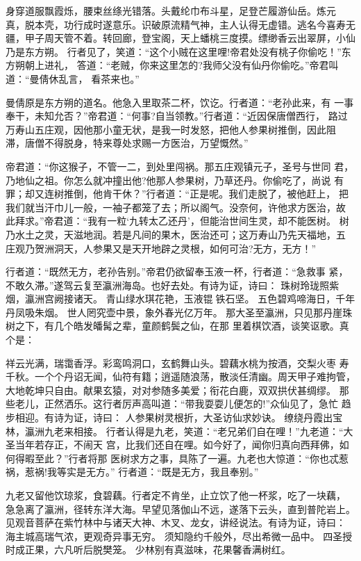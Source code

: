 身穿道服飘霞烁，腰束丝绦光错落。头戴纶巾布斗星，足登芒履游仙岳。炼元
真，脱本壳，功行成时遂意乐。识破原流精气神，主人认得无虚错。逃名今喜寿无
疆，甲子周天管不着。转回廊，登宝阁，天上蟠桃三度摸。缥缈香云出翠屏，小仙
乃是东方朔。
行者见了，笑道：“这个小贼在这里哩!帝君处没有桃子你偷吃！”东方朔朝上进礼，
答道：“老贼，你来这里怎的?我师父没有仙丹你偷吃。”帝君叫道：“曼倩休乱言，
看茶来也。”

曼倩原是东方朔的道名。他急入里取茶二杯，饮讫。行者道：“老孙此来，有
一事奉干，未知允否？”帝君道：“何事?自当领教。”行者道：“近因保唐僧西行，
路过万寿山五庄观，因他那小童无状，是我一时发怒，把他人参果树推倒，因此阻
滞，唐僧不得脱身，特来尊处求赐一方医治，万望慨然。”

帝君道：“你这猴子，不管一二，到处里闯祸。那五庄观镇元子，圣号与世同
君，乃地仙之祖。你怎么就冲撞出他?他那人参果树，乃草还丹。你偷吃了，尚说
有罪；却又连树推倒，他肯干休？”行者道：“正是呢。我们走脱了，被他赶上，
把我们就当汗巾儿一般，一袖子都笼了去；所以阁气。没奈何，许他求方医治，故
此拜求。”帝君道：“我有一粒‘九转太乙还丹’，但能治世间生灵，却不能医树。
树乃水土之灵，天滋地润。若是凡间的果木，医治还可；这万寿山乃先天福地，五
庄观乃贺洲洞天，人参果又是天开地辟之灵根，如何可治?无方，无方！”

行者道：“既然无方，老孙告别。”帝君仍欲留奉玉液一杯，行者道：“急救事
紧，不敢久滞。”遂驾云复至瀛洲海岛。也好去处。有诗为证，诗曰：
珠树玲珑照紫烟，瀛洲宫阙接诸天。
青山绿水琪花艳，玉液锟铁石坚。
五色碧鸡啼海日，千年丹凤吸朱烟。
世人罔究壶中景，象外春光亿万年。
那大圣至瀛洲，只见那丹崖珠树之下，有几个皓发皤髯之辈，童颜鹤鬓之仙，在那
里着棋饮酒，谈笑讴歌。真个是：

祥云光满，瑞霭香浮。彩鸾鸣洞口，玄鹤舞山头。碧藕水桃为按酒，交梨火枣
寿千秋。一个个丹诏无闻，仙符有籍；逍遥随浪荡，散淡任清幽。周天甲子难拘管，
大地乾坤只自由。献果玄猿，对对参随多美爱；衔花白鹿，双双拱伏甚绸缪。
那些老儿，正然洒乐。这行者厉声高叫道：“带我耍耍儿便怎的!”众仙见了，急忙
趋步相迎。有诗为证，诗曰：
人参果树灵根折，大圣访仙求妙诀。
缭绕丹霞出宝林，瀛洲九老来相接。
行者认得是九老，笑道：“老兄弟们自在哩！”九老道：“大圣当年若存正，不闹天
宫，比我们还自在哩。如今好了，闻你归真向西拜佛，如何得暇至此？”行者将那
医树求方之事，具陈了一遍。九老也大惊道：“你也忒惹祸，惹祸!我等实是无方。”
行者道：“既是无方，我且奉别。”

九老又留他饮琼浆，食碧藕。行者定不肯坐，止立饮了他一杯浆，吃了一块藕，
急急离了瀛洲，径转东洋大海。早望见落伽山不远，遂落下云头，直到普陀岩上。
见观音菩萨在紫竹林中与诸天大神、木叉、龙女，讲经说法。有诗为证，诗曰：
海主城高瑞气浓，更观奇异事无穷。
须知隐约千般外，尽出希微一品中。
四圣授时成正果，六凡听后脱樊笼。
少林别有真滋味，花果馨香满树红。

